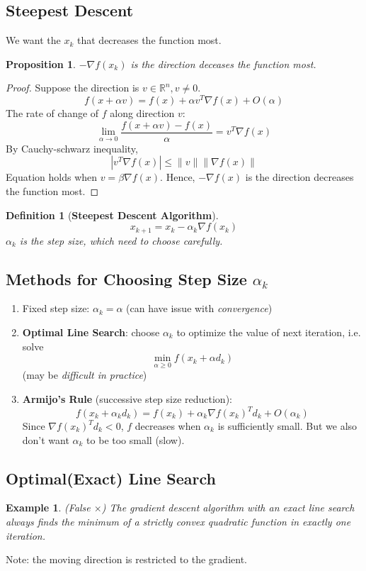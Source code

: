 \documentclass[11pt,a4paper]{article}
\newtheorem{definition}{Definition}
\newtheorem{proposition}{Proposition}
\newtheorem{example}{Example}
\begin{document}
\subsection{Steepest Descent}
We want the $x_k$ that decreases the function most.
\begin{proposition}
$-\nabla f(x_k)$ is the direction deceases the function most.
\end{proposition}
\begin{proof}
Suppose the direction is $v\in \mathbb{R}^n, v\neq 0$.
$$f(x+\alpha v)=f(x)+\alpha v^T \nabla f(x)+O(\alpha)$$
The rate of change of $f$ along direction $v$:
$$\lim_{\alpha \rightarrow 0}\frac{f(x+\alpha v)-f(x)}{\alpha}=v^T\nabla f(x)$$
By Cauchy-schwarz inequality,
$$|v^T\nabla f(x)|\leq \|v\|\|\nabla f(x)\|$$
Equation holds when $v=\beta \nabla f(x)$. Hence, $-\nabla f(x)$ is the direction decreases the function most.
\end{proof}

\begin{definition}[\textbf{Steepest Descent Algorithm}]
$$x_{k+1}=x_k-\alpha_k \nabla f(x_k)$$
$\alpha_k$ is the step size, which need to choose carefully.
\end{definition}

\subsection{Methods for Choosing Step Size $\alpha_k$}
\begin{enumerate}[Method (1):]
    \item Fixed step size: $\alpha_k=\alpha$ (can have issue with \textit{convergence})
    \item \textbf{Optimal Line Search}: choose $\alpha_k$ to optimize the value of next iteration, i.e. solve $$\min_{\alpha\geq 0}f(x_k+\alpha d_k)$$ (may be \textit{difficult in practice})
    \item \textbf{Armijo's Rule} (successive step size reduction):$$f(x_k+\alpha_k d_k)=f(x_k)+\alpha_k \nabla f(x_k)^T d_k+O(\alpha_k)$$
    Since $\nabla f(x_k)^T d_k<0$, $f$ decreases when $\alpha_k$ is sufficiently small. But we also don't want $\alpha_k$ to be too small (slow).
\end{enumerate}

\subsection*{Optimal(Exact) Line Search}
\begin{example}
    (False $\times$) The gradient descent algorithm with an exact line search always finds the minimum of a strictly convex quadratic function in exactly one iteration.
\end{example}
Note: the moving direction is restricted to the gradient.
\end{document}
